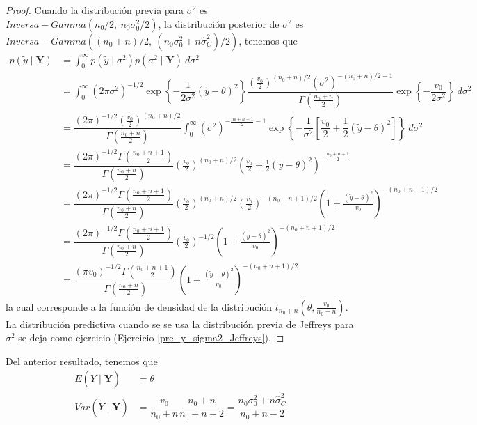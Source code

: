 \documentclass[10pt,openright]{book}\usepackage[]{graphicx}\usepackage[]{color}
\begin{document}
    \begin{proof}
    Cuando la distribuci\'on previa para $\sigma^2$ es $Inversa-Gamma(n_0/2,\ n_0\sigma^2_0/2)$, la distribuci\'on posterior de $\sigma^2$ es $Inversa-Gamma((n_0+n)/2,\ (n_0\sigma^2_0+n\hat{\sigma}^2_C)/2)$, tenemos que 
    \begin{align*}
    p(\tilde{y}\mid\mathbf{Y})&=\int_0^\infty p(\tilde{y}\mid\sigma^2)p(\sigma^2\mid\mathbf{Y})\ d\sigma^2\\
    &=\int_0^\infty (2\pi\sigma^2)^{-1/2}\exp\left\{-\dfrac{1}{2\sigma^2}(\tilde{y}-\theta)^2\right\}\dfrac{(\frac{v_0}{2})^{(n_0+n)/2}(\sigma^2)^{-(n_0+n)/2-1}}{\Gamma(\frac{n_0+n}{2})}\exp\left\{-\dfrac{v_0}{2\sigma^2}\right\}\ d\sigma^2\\
    &=\dfrac{(2\pi)^{-1/2}(\frac{v_0}{2})^{(n_0+n)/2}}{\Gamma(\frac{n_0+n}{2})}\int_0^\infty(\sigma^2)^{-\frac{n_0+n+1}{2}-1}\exp\left\{-\dfrac{1}{\sigma^2}\left[\dfrac{v_0}{2}+\dfrac{1}{2}(\tilde{y}-\theta)^2\right]\right\}\ d\sigma^2\\
    &=\dfrac{(2\pi)^{-1/2}\Gamma(\frac{n_0+n+1}{2})}{\Gamma(\frac{n_0+n}{2})}\left(\frac{v_0}{2}\right)^{(n_0+n)/2}
    \left(\frac{v_0}{2}+\frac{1}{2}(\tilde{y}-\theta)^2\right)^{-\frac{n_0+n+1}{2}}\\
    &=\dfrac{(2\pi)^{-1/2}\Gamma(\frac{n_0+n+1}{2})}{\Gamma(\frac{n_0+n}{2})}\left(\frac{v_0}{2}\right)^{(n_0+n)/2}\left(\frac{v_0}{2}\right)^{-(n_0+n+1)/2}\left(1+\frac{(\tilde{y}-\theta)^2}{v_0}\right)^{-(n_0+n+1)/2}\\
    &=\dfrac{(2\pi)^{-1/2}\Gamma(\frac{n_0+n+1}{2})}{\Gamma(\frac{n_0+n}{2})}\left(\frac{v_0}{2}\right)^{-1/2}\left(1+\frac{(\tilde{y}-\theta)^2}{v_0}\right)^{-(n_0+n+1)/2}\\
    &=\dfrac{(\pi v_0)^{-1/2}\Gamma(\frac{n_0+n+1}{2})}{\Gamma(\frac{n_0+n}{2})}\left(1+\frac{(\tilde{y}-\theta)^2}{v_0}\right)^{-(n_0+n+1)/2}
    \end{align*}
    la cual corresponde a la funci\'on de densidad de la distribuci\'on $t_{n_0+n}\left(\theta,\frac{v_0}{n_0+n}\right)$. La distribuci\'on predictiva cuando se se usa la distribuci\'on previa de Jeffreys para $\sigma^2$ se deja como ejercicio (Ejercicio \ref{pre_y_sigma2_Jeffreys}).
    \end{proof}
    
    Del anterior resultado, tenemos que
    \begin{align*}
    E(\tilde{Y}\mid\mathbf{Y})&=\theta\\
    Var(\tilde{Y}\mid\mathbf{Y})&=\dfrac{v_0}{n_0+n}\dfrac{n_0+n}{n_0+n-2}=\dfrac{n_0\sigma^2_0+n\hat{\sigma}^2_C}{n_0+n-2}\\
    \end{align*}
    
\end{document}
